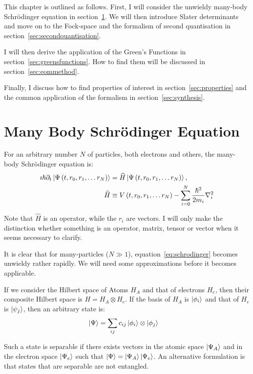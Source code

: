 This chapter is outlined as follows. First, I will consider the unwieldy many-body Schr\"odinger equation in section~\ref{sec:schrodinger}. We will then introduce Slater determinants and move on to the Fock-space and the formalism of second quantisation in section~\ref{sec:secondquantisation}. 

I will then derive the application of the Green's Functions in section~\ref{sec:greensfunctions}. How to find them will be discussed in section~\ref{sec:eommethod}.

Finally, I discuss how to find properties of interest in section~\ref{sec:properties} and the common application of the formalism in section~\ref{sec:synthesis}.

\section{Many Body Schr\"odinger Equation}
\label{sec:schrodinger}

For an arbitrary number $N$ of particles, both electrons and others, the many-body Schr\"odinger equation is:
\begin{align}
 \imath \hslash \partial_t\ket{\Psi\left(t, r_0, r_1, \ldots r_N\right)} &= \widehat{H} \ket{\Psi\left(t, r_0, r_1, \ldots r_N\right)} \label{eq:schrodinger}, \\
 \widehat{H} &\equiv V\left(t, r_0, r_1, \ldots r_N\right) - \sum_{i=0}^N \frac{\hslash^2}{2m_i} \nabla_i^2
\end{align}

Note that $\widehat{H}$ is an operator, while the $r_i$ are vectors. I will only make the distinction whether something is an operator, matrix, tensor or vector when it seems necessary to clarify.

It is clear that for many-particles ($N\gg 1$), equation~\ref{eq:schrodinger} becomes unwieldy rather rapidly. We will need some approximations before it becomes applicable.

If we consider the Hilbert space of Atoms $H_A$ and that of electrons $H_e$, then their composite Hilbert space is $H = H_A \otimes H_e$. If the basis of $H_A$ is $\ket{\phi_i}$ and that of $H_e$ is $\ket{\psi_j}$, then an arbitrary state is:
\begin{align}
\ket{\Psi} &= \sum_{ij} c_{ij} \ket{\phi_i} \otimes \ket{\phi_j}
\end{align}

Such a state is separable if there exists vectors in the atomic space $\ket{\Psi_A}$ and in the electron space $\ket{\Psi_e}$ such that $\ket{\Psi} = \ket{\Psi_A} \ket{\Psi_e}$. An alternative formulation is that states that are separable are not entangled.

